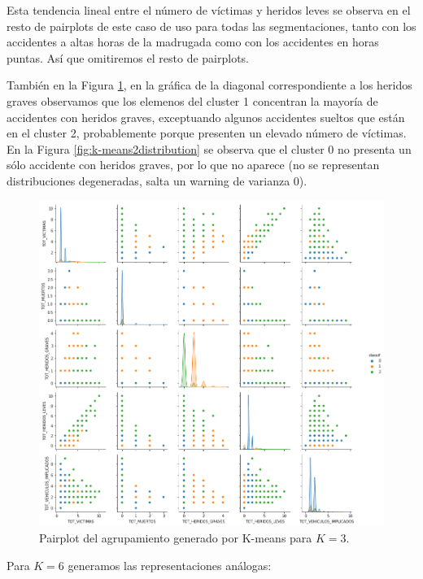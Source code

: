 \documentclass[oneside]{book}
\begin{document}
Esta tendencia lineal entre el número de víctimas y heridos leves se
observa en el resto de pairplots de este caso de uso para todas las
segmentaciones, tanto con los accidentes a altas horas de la madrugada
como con los accidentes en horas puntas. Así que omitiremos el resto
de pairplots.

También en la Figura \ref{fig:k-means2pair}, en la gráfica de la
diagonal correspondiente a los heridos graves observamos que los
elemenos del cluster 1 concentran la mayoría de accidentes con heridos
graves, exceptuando algunos accidentes sueltos que están en el cluster
2, probablemente porque presenten un elevado número de víctimas. En la
Figura \ref{fig:k-means2distribution} se observa que el cluster 0 no
presenta un sólo accidente con heridos graves, por lo que no aparece
(no se representan distribuciones degeneradas, salta un warning de
varianza 0).

\begin{figure}[H]
  \centering
  \includegraphics[width=160mm]{figures/accidentes/k-means2pair}
  \caption{Pairplot del agrupamiento generado por K-means para $K=3$.}
  \label{fig:k-means2pair}
\end{figure}

\pagebreak

Para $K=6$ generamos las representaciones análogas:
\end{document}
